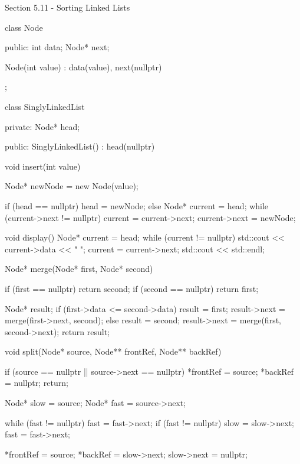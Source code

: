 \begin{notes}{Section 5.11 - Sorting Linked Lists}
\begin{highlight}
\begin{code}[C++]
    class Node {
    public:
        int data;
        Node* next;
    
        Node(int value) : data(value), next(nullptr) {}
    };
    
    class SinglyLinkedList {
    private:
        Node* head;
    
    public:
        SinglyLinkedList() : head(nullptr) {}
    
        void insert(int value) {
            Node* newNode = new Node(value);
    
            if (head == nullptr) {
                head = newNode;
            } else {
                Node* current = head;
                while (current->next != nullptr) {
                    current = current->next;
                }
                current->next = newNode;
            }
        }
    
        void display() {
            Node* current = head;
            while (current != nullptr) {
                std::cout << current->data << " ";
                current = current->next;
            }
            std::cout << std::endl;
        }
    
        Node* merge(Node* first, Node* second) {
            if (first == nullptr)
                return second;
            if (second == nullptr)
                return first;
    
            Node* result;
            if (first->data <= second->data) {
                result = first;
                result->next = merge(first->next, second);
            } else {
                result = second;
                result->next = merge(first, second->next);
            }
            return result;
        }
    
        void split(Node* source, Node** frontRef, Node** backRef) {
            if (source == nullptr || source->next == nullptr) {
                *frontRef = source;
                *backRef = nullptr;
                return;
            }
    
            Node* slow = source;
            Node* fast = source->next;
    
            while (fast != nullptr) {
                fast = fast->next;
                if (fast != nullptr) {
                    slow = slow->next;
                    fast = fast->next;
                }
            }
    
            *frontRef = source;
            *backRef = slow->next;
            slow->next = nullptr;
        }
    
}
\end{code}
\end{highlight}
\end{notes}
